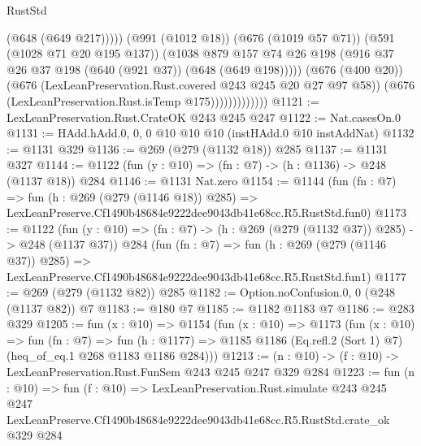 \begin{lexlean}{RustStd}
\begin{coremodule}
                                  (@648 (@649 @217)))))
                            (@991 (@1012 @18))
                            (@676 (@1019 @57 @71))
                            (@591 (@1028 @71 @20 @195 @137))
                            (@1038
                              @879
                              @157
                              @74
                              @26
                              @198
                              (@916 @37 @26 @37 @198 (@640 (@921 @37)) (@648 (@649 @198)))))
                          (@676 (@400 @20))
                          (@676 (LexLeanPreservation.Rust.covered @243 @245 @20 @27 @97 @58))
                          (@676 (LexLeanPreservation.Rust.isTemp @175)))))))))))))
@1121 := LexLeanPreservation.Rust.CrateOK @243 @245 @247
@1122 := Nat.casesOn.{0}
@1131 := HAdd.hAdd.{0, 0, 0} @10 @10 @10 (instHAdd.{0} @10 instAddNat)
@1132 := @1131 @329
@1136 := @269 (@279 (@1132 @18)) @285
@1137 := @1131 @327
@1144 := @1122 (fun (y : @10) => (fn : @7) -> (h : @1136) -> @248 (@1137 @18)) @284
@1146 := @1131 Nat.zero
@1154 := @1144
    (fun (fn : @7) =>
    fun (h : @269 (@279 (@1146 @18)) @285) =>
    LexLeanPreserve.Cf1490b48684e9222dee9043db41e68cc.R5.RustStd.fun0)
@1173 := @1122
    (fun (y : @10) => (fn : @7) -> (h : @269 (@279 (@1132 @37)) @285) -> @248 (@1137 @37))
    @284
    (fun (fn : @7) =>
    fun (h : @269 (@279 (@1146 @37)) @285) =>
    LexLeanPreserve.Cf1490b48684e9222dee9043db41e68cc.R5.RustStd.fun1)
@1177 := @269 (@279 (@1132 @82)) @285
@1182 := Option.noConfusion.{0, 0} (@248 (@1137 @82)) @7
@1183 := @180 @7
@1185 := @1182 @1183 @7
@1186 := @283 @329
@1205 := fun (x : @10) =>
  @1154
    (fun (x : @10) =>
    @1173
      (fun (x : @10) =>
      fun (fn : @7) =>
      fun (h : @1177) =>
      @1185 @1186 (Eq.refl.{2} (Sort 1) @7) (heq_of_eq.{1} @268 @1183 @1186 @284)))
@1213 := (n : @10) -> (f : @10) -> LexLeanPreservation.Rust.FunSem @243 @245 @247 @329 @284
@1223 := fun (n : @10) =>
  fun (f : @10) =>
  LexLeanPreservation.Rust.simulate
    @243
    @245
    @247
    LexLeanPreserve.Cf1490b48684e9222dee9043db41e68cc.R5.RustStd.crate_ok
    @329
    @284
\end{coremodule}
\end{lexlean}
